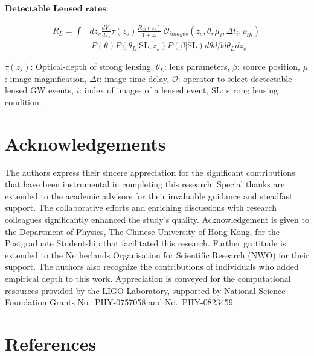 \documentclass[10pt,a4paper,onecolumn]{article}
\let\textttOrig=\texttt
\def\texttt#1{\expandafter\textttOrig{\seqsplit{#1}}}
\let\addcontentslineOrig=\addcontentsline
\def\addcontentsline#1#2#3{\bgroup
  \let\texttt=\textttOrig\addcontentslineOrig{#1}{#2}{#3}\egroup}
\begin{document}
\(\textbf{Detectable Lensed rates:}\)

\begin{equation*}
\begin{split}
R_L = \int & dz_s \frac{dV_c}{dz_s}\tau(z_s)\frac{R_m(z_s)}{1+z_s} \,\mathcal{O}_{images}(z_s,\theta,\mu_i,\Delta t_i, \rho_{th}) \, \\ 
& \, P(\theta) P(\theta_L|\text{SL},z_s) P(\beta|\text{SL}) d\theta d\beta d\theta_L dz_s 
\end{split}
\end{equation*}

\(\tau(z_s)\): Optical-depth of strong lensing, \(\theta_L\): lens
parameters, \(\beta\): source position, \(\mu\): image magnification,
\(\Delta t\): image time delay, \(\mathcal{O}\): operator to select
dectectable lensed GW events, \(i\): index of images of a lensed event,
\(\text{SL}\): strong lensing condition.

\section{Acknowledgements}\label{acknowledgements}

The authors express their sincere appreciation for the significant
contributions that have been instrumental in completing this research.
Special thanks are extended to the academic advisors for their
invaluable guidance and steadfast support. The collaborative efforts and
enriching discussions with research colleagues significantly enhanced
the study's quality. Acknowledgement is given to the Department of
Physics, The Chinese University of Hong Kong, for the Postgraduate
Studentship that facilitated this research. Further gratitude is
extended to the Netherlands Organisation for Scientific Research (NWO)
for their support. The authors also recognize the contributions of
individuals who added empirical depth to this work. Appreciation is
conveyed for the computational resources provided by the LIGO
Laboratory, supported by National Science Foundation Grants
No.~PHY-0757058 and No.~PHY-0823459.

\section*{References}\label{references}
\end{document}
